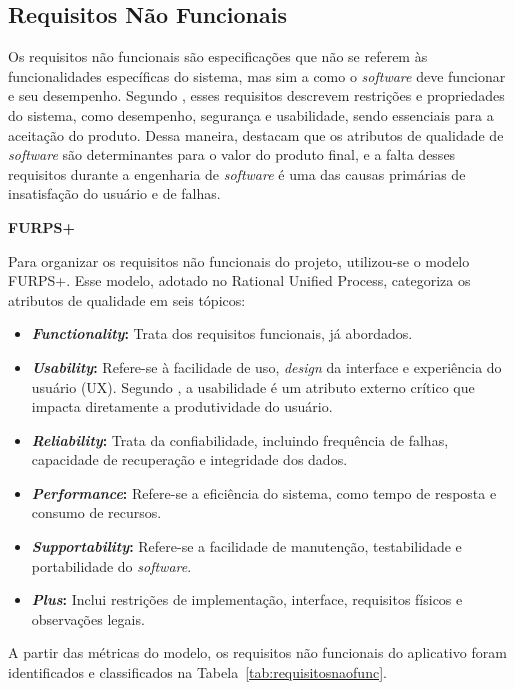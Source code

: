 \subsection{Requisitos Não Funcionais}

Os requisitos não funcionais são especificações que não se referem às funcionalidades específicas do sistema, mas sim a como o \textit{software} deve funcionar e seu desempenho.
Segundo , esses requisitos descrevem restrições e propriedades do sistema, como desempenho, segurança e usabilidade, sendo essenciais para a aceitação do produto.
Dessa maneira,  destacam que os atributos de qualidade de \textit{software} são determinantes para o valor do produto final, e a falta desses requisitos durante a engenharia de \textit{software} é uma das causas primárias de insatisfação do usuário e de falhas.

\textbf{FURPS+}

Para organizar os requisitos não funcionais do projeto, utilizou-se o modelo FURPS+.
Esse modelo, adotado no Rational Unified Process, categoriza os atributos de qualidade em seis tópicos:

\begin{itemize}
    \item \textbf{\textit{Functionality}:} Trata dos requisitos funcionais, já abordados.
    \item \textbf{\textit{Usability}:} Refere-se à facilidade de uso, \textit{design} da interface e experiência do usuário (UX).
    Segundo , a usabilidade é um atributo externo crítico que impacta diretamente a produtividade do usuário.
    \item \textbf{\textit{Reliability}:} Trata da confiabilidade, incluindo frequência de falhas, capacidade de recuperação e integridade dos dados.
    \item \textbf{\textit{Performance}:} Refere-se a eficiência do sistema, como tempo de resposta e consumo de recursos.
    \item \textbf{\textit{Supportability}:} Refere-se a facilidade de manutenção, testabilidade e portabilidade do \textit{software}.
    \item \textbf{\textit{Plus}:} Inclui restrições de implementação, interface, requisitos físicos e observações legais.
\end{itemize}

A partir das métricas do modelo, os requisitos não funcionais do aplicativo foram identificados e classificados na Tabela~\ref{tab:requisitosnaofunc}.

